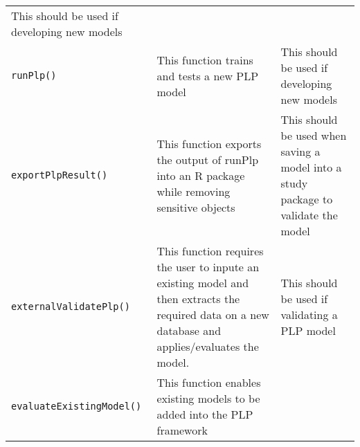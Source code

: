\documentclass[]{article}
\begin{document}
\begin{longtable}[]{@{}lll@{}}
\begin{minipage}[t]{0.10\columnwidth}
This should be used if developing new models\strut
\end{minipage}\tabularnewline
\begin{minipage}[t]{0.11\columnwidth}\raggedright\strut
\texttt{runPlp()}\strut
\end{minipage} & \begin{minipage}[t]{0.18\columnwidth}\raggedright\strut
This function trains and tests a new PLP model\strut
\end{minipage} & \begin{minipage}[t]{0.10\columnwidth}\raggedright\strut
This should be used if developing new models\strut
\end{minipage}\tabularnewline
\begin{minipage}[t]{0.11\columnwidth}\raggedright\strut
\texttt{exportPlpResult()}\strut
\end{minipage} & \begin{minipage}[t]{0.18\columnwidth}\raggedright\strut
This function exports the output of runPlp into an R package while
removing sensitive objects\strut
\end{minipage} & \begin{minipage}[t]{0.10\columnwidth}\raggedright\strut
This should be used when saving a model into a study package to validate
the model\strut
\end{minipage}\tabularnewline
\begin{minipage}[t]{0.11\columnwidth}\raggedright\strut
\texttt{externalValidatePlp()}\strut
\end{minipage} & \begin{minipage}[t]{0.18\columnwidth}\raggedright\strut
This function requires the user to inpute an existing model and then
extracts the required data on a new database and applies/evaluates the
model.\strut
\end{minipage} & \begin{minipage}[t]{0.10\columnwidth}\raggedright\strut
This should be used if validating a PLP model\strut
\end{minipage}\tabularnewline
\begin{minipage}[t]{0.11\columnwidth}\raggedright\strut
\texttt{evaluateExistingModel()}\strut
\end{minipage} & \begin{minipage}[t]{0.18\columnwidth}\raggedright\strut
This function enables existing models to be added into the PLP
framework\strut
\end{minipage} & \begin{minipage}[t]{0.10\columnwidth}\raggedright\strut

\end{minipage}
\end{longtable}
\end{document}
